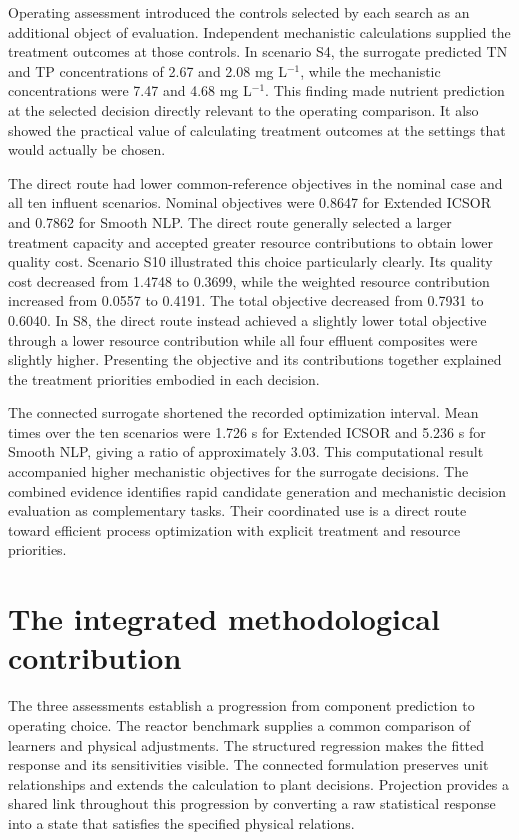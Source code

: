 Operating assessment introduced the controls selected by each search as an additional object of evaluation. Independent mechanistic calculations supplied the treatment outcomes at those controls. In scenario S4, the surrogate predicted TN and TP concentrations of 2.67 and 2.08 mg L$^{-1}$, while the mechanistic concentrations were 7.47 and 4.68 mg L$^{-1}$. This finding made nutrient prediction at the selected decision directly relevant to the operating comparison. It also showed the practical value of calculating treatment outcomes at the settings that would actually be chosen.

The direct route had lower common-reference objectives in the nominal case and all ten influent scenarios. Nominal objectives were 0.8647 for Extended ICSOR and 0.7862 for Smooth NLP. The direct route generally selected a larger treatment capacity and accepted greater resource contributions to obtain lower quality cost. Scenario S10 illustrated this choice particularly clearly. Its quality cost decreased from 1.4748 to 0.3699, while the weighted resource contribution increased from 0.0557 to 0.4191. The total objective decreased from 0.7931 to 0.6040. In S8, the direct route instead achieved a slightly lower total objective through a lower resource contribution while all four effluent composites were slightly higher. Presenting the objective and its contributions together explained the treatment priorities embodied in each decision.

The connected surrogate shortened the recorded optimization interval. Mean times over the ten scenarios were 1.726 s for Extended ICSOR and 5.236 s for Smooth NLP, giving a ratio of approximately 3.03. This computational result accompanied higher mechanistic objectives for the surrogate decisions. The combined evidence identifies rapid candidate generation and mechanistic decision evaluation as complementary tasks. Their coordinated use is a direct route toward efficient process optimization with explicit treatment and resource priorities.

\section{The integrated methodological contribution}
\label{sec:assessment_conclusions}

The three assessments establish a progression from component prediction to operating choice. The reactor benchmark supplies a common comparison of learners and physical adjustments. The structured regression makes the fitted response and its sensitivities visible. The connected formulation preserves unit relationships and extends the calculation to plant decisions. Projection provides a shared link throughout this progression by converting a raw statistical response into a state that satisfies the specified physical relations.


